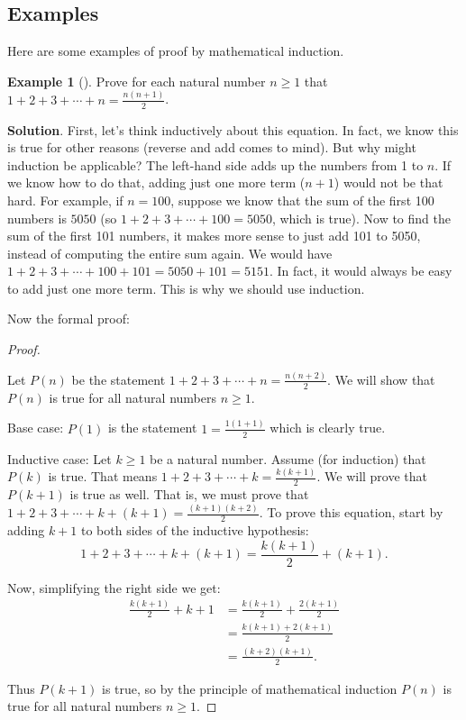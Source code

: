 \documentclass[10pt,]{book}
\theoremstyle{plain}
\theoremstyle{definition}
\theoremstyle{definition}
\newtheorem{example}[theorem]{Example}
\theoremstyle{definition}
\theoremstyle{definition}
\numberwithin{equation}{chapter}
\newcommand{\amp}{&}
\begin{document}
\subsection[{Examples}]{Examples}\label{subsec_induction-examples}
\hypertarget{p-2223}{}%
Here are some examples of proof by mathematical induction.%
\begin{example}[]\label{example-74}
\hypertarget{p-2224}{}%
Prove for each natural number \(n \ge 1\) that \(1 + 2 + 3 + \cdots + n = \frac{n(n+1)}{2}\).%
\par\smallskip%
\noindent\textbf{Solution}.\hypertarget{solution-198}{}\quad%
\hypertarget{p-2225}{}%
First, let's think inductively about this equation. In fact, we know this is true for other reasons (reverse and add comes to mind). But why might induction be applicable? The left-hand side adds up the numbers from 1 to \(n\). If we know how to do that, adding just one more term (\(n+1\)) would not be that hard. For example, if \(n = 100\), suppose we know that the sum of the first 100 numbers is \(5050\) (so \(1 + 2 + 3 + \cdots + 100 = 5050\), which is true). Now to find the sum of the first 101 numbers, it makes more sense to just add 101 to 5050, instead of computing the entire sum again. We would have \(1 + 2 + 3 + \cdots + 100 + 101 = 5050 + 101 = 5151\). In fact, it would always be easy to add just one more term. This is why we should use induction.%
\par
\hypertarget{p-2226}{}%
Now the formal proof:%
\begin{proof}\hypertarget{proof-38}{}
\hypertarget{p-2227}{}%
Let \(P(n)\) be the statement \(1 + 2 + 3 + \cdots + n = \frac{n(n+2)}{2}\). We will show that \(P(n)\) is true for all natural numbers \(n \ge 1\).%
\par
\hypertarget{p-2228}{}%
Base case: \(P(1)\) is the statement \(1 = \frac{1(1+1)}{2}\) which is clearly true.%
\par
\hypertarget{p-2229}{}%
Inductive case: Let \(k \ge 1\) be a natural number. Assume (for induction) that \(P(k)\) is true. That means \(1 + 2 + 3 + \cdots + k = \frac{k(k+1)}{2}\). We will prove that \(P(k+1)\) is true as well. That is, we must prove that \(1 + 2 + 3 + \cdots + k + (k+1) = \frac{(k+1)(k+2)}{2}\). To prove this equation, start by adding \(k+1\) to both sides of the inductive hypothesis:%
\begin{equation*}
1 + 2 + 3 + \cdots + k + (k+1) = \frac{k(k+1)}{2} + (k+1).
\end{equation*}
%
\par
\hypertarget{p-2230}{}%
Now, simplifying the right side we get:%
\begin{align*}
\frac{k(k+1)}{2} + k+1 \amp = \frac{k(k+1)}{2} + \frac{2(k+1)}{2}\\
\amp = \frac{k(k+1) + 2(k+1)}{2}\\
\amp = \frac{(k+2)(k+1)}{2}.
\end{align*}
%
\par
\hypertarget{p-2231}{}%
Thus \(P(k+1)\) is true, so by the principle of mathematical induction \(P(n)\) is true for all natural numbers \(n \ge 1\).%
\end{proof}
\end{example}
\end{document}
